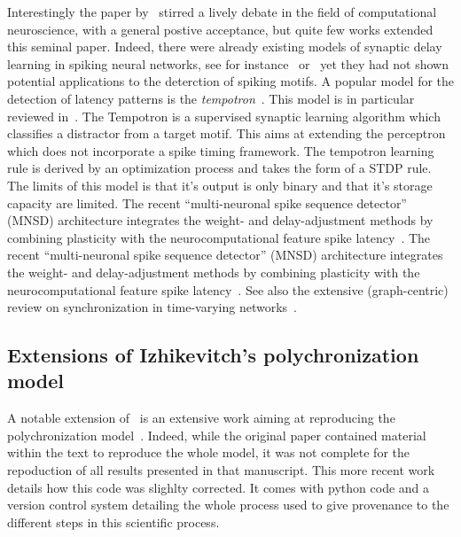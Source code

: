 \documentclass[brainsci, %
               review,submit,pdftex,moreauthors%
               ]{Definitions/mdpi}
\begin{document}
Interestingly the paper by~\citet{izhikevich_polychronization_2006} stirred a lively debate in the field of computational neuroscience, with a general postive acceptance, but quite few works extended this seminal paper.
Indeed, there were already existing models of synaptic delay learning in spiking neural networks, see for instance~\citep{huning_synaptic_1998} or~\citep{eurich_dynamics_1999} yet they had not shown potential applications to the deterction of spiking motifs. A popular model for the detection of latency patterns is the \emph{tempotron}~\citep{gutig_tempotron_2006}. This model is in particular reviewed in~\citep{gutig_spike_2014}. The Tempotron is a supervised synaptic learning algorithm which classifies a distractor from a target motif. This aims at extending the perceptron which does not incorporate a spike timing framework. The tempotron learning rule is derived by an optimization process and takes the form of a STDP rule.  The limits of this model is that it's output is only binary and that it's storage capacity are limited.
The recent ``multi-neuronal spike sequence detector'' (MNSD) architecture integrates the weight- and delay-adjustment methods by combining plasticity with the neurocomputational feature spike latency~\citep{susi_nmnsd-spiking_2021}.
The recent ``multi-neuronal spike sequence detector'' (MNSD) architecture integrates the weight- and delay-adjustment methods by combining plasticity with the neurocomputational feature spike latency~\citep{susi_nmnsd-spiking_2021}. See also the extensive (graph-centric) review on synchronization in time-varying networks~\citep{ghosh_synchronized_2022}.


\subsection{Extensions of Izhikevitch's polychronization model}
%
A notable extension of~\citep{izhikevich_polychronization_2006} is an extensive work aiming at reproducing the polychronization model~\citep{pauli_reproducing_2018}. Indeed, while the original paper contained material within the text to reproduce the whole model, it was not complete for the repoduction of all results presented in that manuscript. This more recent work details how this code was slighlty corrected. It comes with python code and a version control system detailing the whole process used to give provenance to the different steps in this scientific process.
\end{document}
